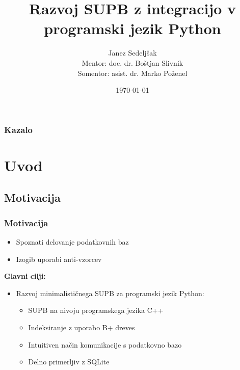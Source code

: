 \documentclass{beamer}
\title{Razvoj SUPB z integracijo v programski jezik Python} %
\author{Janez Sedeljšak
\\ Mentor: doc. dr. Boštjan Slivnik
\\ Somentor: asist. dr. Marko Poženel
} %
\institute[UL FRI] %
{
Univerza v Ljubljani, Fakulteta za računalništvo in informatiko \\ %
\medskip
\textit{js0578@student.uni-lj.si} %
}
\date{\today} %
\begin{document}
\begin{frame}
\titlepage %
\end{frame}

\setcounter{tocdepth}{1}

\begin{frame}
\frametitle{Kazalo} %
\tableofcontents %
\end{frame}


\section{Uvod} %

\subsection{Motivacija}
\begin{frame}
\frametitle{Motivacija}
    \begin{itemize}
        \item{Spoznati delovanje podatkovnih baz}
        \item{Izogib uporabi anti-vzorcev}
    \end{itemize}
    \textbf{Glavni cilji:}
    \begin{itemize}
        \item{Razvoj minimalističnega SUPB za programski jezik Python:}
        \begin{itemize}
            \item{SUPB na nivoju programskega jezika C++}
            \item{Indeksiranje z uporabo B+ dreves}
            \item{Intuitiven način komunikacije s podatkovno bazo}
            \item{Delno primerljiv z SQLite}
        \end{itemize}
    \end{itemize}
\end{frame}
\end{document}
